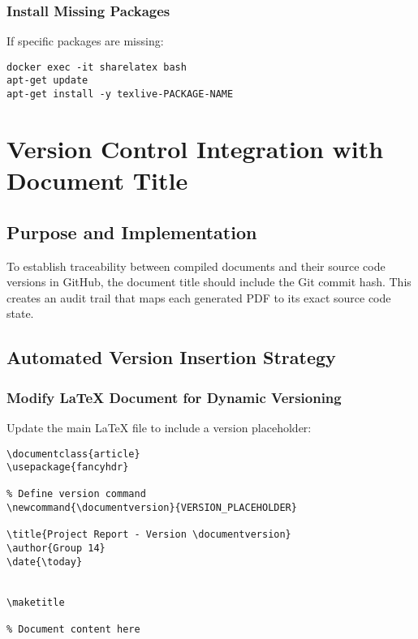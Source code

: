 \subsubsection{Install Missing Packages}

If specific packages are missing:

\begin{verbatim}
docker exec -it sharelatex bash
apt-get update
apt-get install -y texlive-PACKAGE-NAME
\end{verbatim}

\section{Version Control Integration with Document Title}

\subsection{Purpose and Implementation}

To establish traceability between compiled documents and their source code versions in GitHub, the document title should include the Git commit hash. This creates an audit trail that maps each generated PDF to its exact source code state.

\subsection{Automated Version Insertion Strategy}

\subsubsection{Modify LaTeX Document for Dynamic Versioning}

Update the main LaTeX file to include a version placeholder:

\begin{verbatim}
\documentclass{article}
\usepackage{fancyhdr}

% Define version command
\newcommand{\documentversion}{VERSION_PLACEHOLDER}

\title{Project Report - Version \documentversion}
\author{Group 14}
\date{\today}


\maketitle

% Document content here


\end{verbatim}

